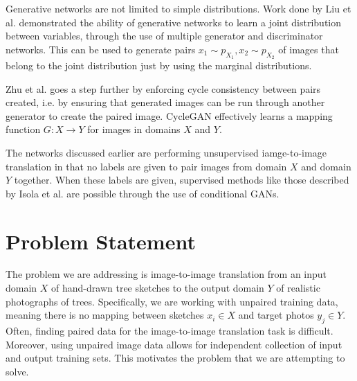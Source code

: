 \documentclass[10pt,twocolumn,letterpaper]{article}
\begin{document}
Generative networks are not limited to simple distributions.
Work done by Liu et al. \cite{cogan} demonstrated the ability of generative networks to learn a joint distribution between variables, through the use of multiple generator and discriminator networks.
This can be used to generate pairs $x_1 \sim p_{X_1}, x_2 \sim p_{X_2}$ of images that belong to the joint distribution just by using the marginal distributions.

Zhu et al. \cite{cycleGAN} goes a step further by enforcing cycle consistency between pairs created, i.e. by ensuring that generated images can be run through another generator to create the paired image.
CycleGAN effectively learns a mapping function $G : X \rightarrow Y$ for images in domains $X$ and $Y$.

The networks discussed earlier are performing unsupervised iamge-to-image translation in that no labels are given to pair images from domain $X$ and domain $Y$ together.
When these labels are given, supervised methods like those described by Isola et al. \cite{pix2pix} are possible through the use of conditional GANs.

\section{Problem Statement}
The problem we are addressing is image-to-image translation from an input domain $X$ of hand-drawn tree sketches to the output domain $Y$ of realistic photographs of trees. Specifically, we are working with unpaired training data, meaning there is no mapping between sketches $x_i\in X$ and target photos $y_j \in Y$. Often, finding paired data for the image-to-image translation task is difficult. Moreover, using unpaired image data allows for independent collection of input and output training sets. This motivates the problem that we are attempting to solve.
\end{document}
